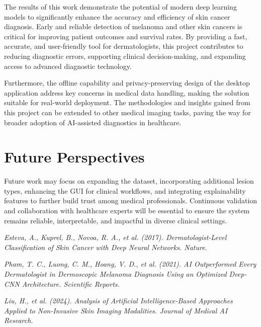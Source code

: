 \documentclass[a4paper,12pt]{report}
\begin{document}
\begin{spacing}{1.5}
    The results of this work demonstrate the potential of modern deep learning models to significantly enhance the accuracy and efficiency of skin cancer diagnosis. Early and reliable detection of melanoma and other skin cancers is critical for improving patient outcomes and survival rates. By providing a fast, accurate, and user-friendly tool for dermatologists, this project contributes to reducing diagnostic errors, supporting clinical decision-making, and expanding access to advanced diagnostic technology.
    
    Furthermore, the offline capability and privacy-preserving design of the desktop application address key concerns in medical data handling, making the solution suitable for real-world deployment. The methodologies and insights gained from this project can be extended to other medical imaging tasks, paving the way for broader adoption of AI-assisted diagnostics in healthcare.
    
    \section*{Future Perspectives}
    
    Future work may focus on expanding the dataset, incorporating additional lesion types, enhancing the GUI for clinical workflows, and integrating explainability features to further build trust among medical professionals. Continuous validation and collaboration with healthcare experts will be essential to ensure the system remains reliable, interpretable, and impactful in diverse clinical settings.

\newpage

\begin{thebibliography}{99}


 \emph{Esteva, A., Kuprel, B., Novoa, R. A., et al. (2017). Dermatologist-Level Classification of Skin Cancer with Deep Neural Networks. Nature.}

 \emph{Pham, T. C., Luong, C. M., Hoang, V. D., et al. (2021). AI Outperformed Every Dermatologist in Dermoscopic Melanoma Diagnosis Using an Optimized Deep-CNN Architecture. Scientific Reports.}

 \emph{Liu, H., et al. (2024). Analysis of Artificial Intelligence-Based Approaches Applied to Non-Invasive Skin Imaging Modalities. Journal of Medical AI Research.}


\end{thebibliography}
\end{spacing}
\end{document}
